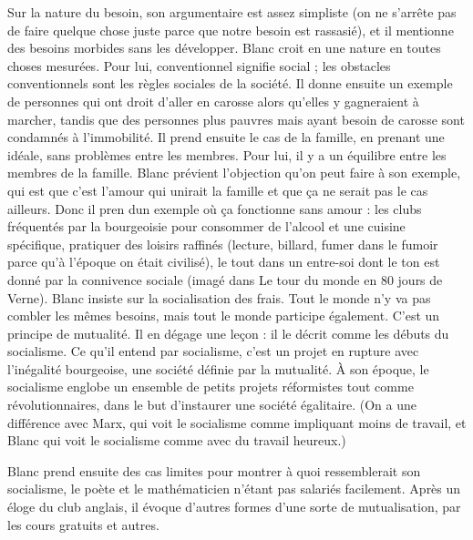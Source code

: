 \documentclass[a4paper,12pt]{book}
\begin{document}
\par Sur la nature du besoin, son argumentaire est assez simpliste (on ne s'arrête pas de faire quelque chose juste parce que notre besoin est rassasié), et il mentionne des besoins morbides sans les développer. Blanc croit en une nature en toutes choses mesurées. Pour lui, conventionnel signifie social ; les obstacles conventionnels sont les règles sociales de la société. Il donne ensuite un exemple de personnes qui ont droit d'aller en carosse alors qu'elles y gagneraient à marcher, tandis que des personnes plus pauvres mais ayant besoin de carosse sont condamnés à l'immobilité. Il prend ensuite le cas de la famille, en prenant une idéale, sans problèmes entre les membres. Pour lui, il y a un équilibre entre les membres de la famille. Blanc prévient l'objection qu'on peut faire à son exemple, qui est que c'est l'amour qui unirait la famille et que ça ne serait pas le cas ailleurs. Donc il pren dun exemple où ça fonctionne sans amour : les clubs fréquentés par la bourgeoisie pour consommer de l'alcool et une cuisine spécifique, pratiquer des loisirs raffinés (lecture, billard, fumer dans le fumoir parce qu'à l'époque on était civilisé), le tout dans un entre-soi dont le ton est donné par la connivence sociale (imagé dans Le tour du monde en 80 jours de Verne). Blanc insiste sur la socialisation des frais. Tout le monde n'y va pas combler les mêmes besoins, mais tout le monde participe également. C'est un principe de mutualité. Il en dégage une leçon : il le décrit comme les débuts du socialisme. Ce qu'il entend par socialisme, c'est un projet en rupture avec l'inégalité bourgeoise, une société définie par la mutualité. À son époque, le socialisme englobe un ensemble de petits projets réformistes tout comme révolutionnaires, dans le but d'instaurer une société égalitaire. (On a une différence avec Marx, qui voit le socialisme comme impliquant moins de travail, et Blanc qui voit le socialisme comme avec du travail heureux.)
\par Blanc prend ensuite des cas limites pour montrer à quoi ressemblerait son socialisme, le poète et le mathématicien n'étant pas salariés facilement. Après un éloge du club anglais, il évoque d'autres formes d'une sorte de mutualisation, par les cours gratuits et autres.
\end{document}
